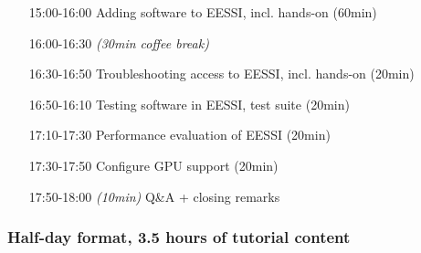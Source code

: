 \begin{itemize}[style=standard, labelwidth=1.9cm]
    \item [15:00-16:00] Adding software to EESSI, incl. hands-on (60min)
    \item [16:00-16:30] \emph{(30min coffee break)}
    \item [16:30-16:50] Troubleshooting access to EESSI, incl. hands-on (20min)
    \item [16:50-16:10] Testing software in EESSI, test suite (20min)
    \item [17:10-17:30] Performance evaluation of EESSI (20min)
    \item [17:30-17:50] Configure GPU support (20min)
    \item [17:50-18:00] \emph{(10min)} Q\&A + closing remarks

\end{itemize}
 

\subsubsection*{Half-day format, 3.5 hours of tutorial content}

